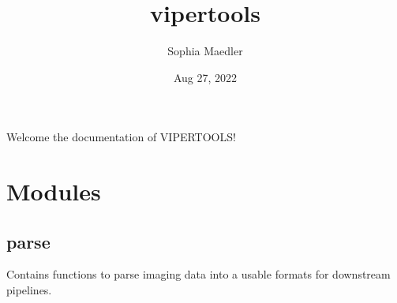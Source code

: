 \documentclass[a4paper,10pt,english,openany,oneside]{sphinxmanual}
\title{vipertools}
\date{Aug 27, 2022}
\author{Sophia Maedler}
\begin{document}
\pagestyle{empty}
\sphinxmaketitle
\pagestyle{plain}
\sphinxtableofcontents
\pagestyle{normal}
\label{\detokenize{index::doc}}


\sphinxAtStartPar
Welcome the documentation of VIPERTOOLS!


\chapter{Modules}
\label{\detokenize{pages/modules:module-vipertools.parse}}\label{\detokenize{pages/modules:modules}}\label{\detokenize{pages/modules::doc}}

\section{parse}
\label{\detokenize{pages/modules:parse}}
\sphinxAtStartPar
Contains functions to parse imaging data into a usable formats for downstream pipelines.
\end{document}

